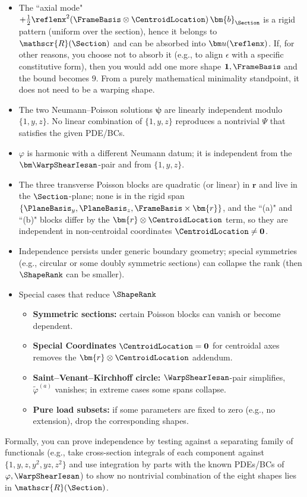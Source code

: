 \begin{itemize}
\item The ``axial mode" \(+\tfrac{1}{2} \reflenx^2(\FrameBasis\otimes\CentroidLocation)\,\bm{b}_{\Section}\) is a {rigid} pattern (uniform over the section), hence it belongs to \(\mathscr{R}(\Section)\) and can be absorbed into \(\bm u(\reflenx)\). 
If, for other reasons, you choose not to absorb it (e.g., to align \(\epsilon\) with a specific constitutive form), then you would add one more shape \(\mathbf{1},\FrameBasis\) and the bound becomes \(9\). 
From a purely mathematical minimality standpoint, it does not need to be a warping shape.

\item The two Neumann–Poisson solutions \(\bm\psi\) are linearly independent modulo \(\{1,y,z\}\). 
No linear combination of \(\{1,y,z\}\) reproduces a nontrivial \(\Psi\) that satisfies the given PDE/BCs.

\item \(\varphi\) is harmonic with a different Neumann datum; it is independent from the \(\bm\WarpShearIesan\)-pair and from \(\{1,y,z\}\).

\item The three transverse Poisson blocks are quadratic (or linear) in \(\bm{r}\) and live in the \(\Section\)-plane; none is in the rigid span \(\{\PlaneBasis_y,\PlaneBasis_z,\FrameBasis\times\bm{r}\}\), and the ``(a)" and ``(b)" blocks differ by the \(\bm{r}\otimes\CentroidLocation\) term, so they are independent in non-centroidal coordinates \(\CentroidLocation \ne \mathbf{0}\).

\item Independence persists under generic boundary geometry; special symmetries (e.g., circular or some doubly symmetric sections) can collapse the rank (then \(\ShapeRank\) can be smaller).

\item Special cases that reduce \(\ShapeRank\)
\begin{itemize}
\item \textbf{Symmetric sections:} certain Poisson blocks can vanish or become dependent.
\item \textbf{Special Coordinates} \(\CentroidLocation=\mathbf{0}\) for centroidal axes removes the \(\bm{r}\otimes\CentroidLocation\) addendum.
\item \textbf{Saint–Venant–Kirchhoff circle:} \(\WarpShearIesan\)-pair simplifies, \(\tilde{\varphi}^{(a)}\) vanishes; in extreme cases some spans collapse.
\item \textbf{Pure load subsets:} if some parameters are fixed to zero (e.g., no extension), drop the corresponding shapes.
\end{itemize}
\end{itemize}
%
Formally, you can prove independence by testing against a separating family of functionals (e.g., take cross-section integrals of each component against \(\{1,y,z,y^2, yz, z^2\}\) and use integration by parts with the known PDEs/BCs of \(\varphi,\WarpShearIesan\)) to show no nontrivial combination of the eight shapes lies in \(\mathscr{R}(\Section)\).


